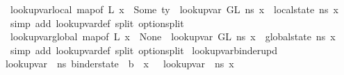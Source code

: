 \begin{isabellebody}
\isanewline
{}\isamarkupfalse%
\ lookup{\isacharunderscore}{\kern0pt}var{\isacharunderscore}{\kern0pt}local{\isacharcolon}{\kern0pt}\ {\isachardoublequoteopen}map{\isacharunderscore}{\kern0pt}of\ L\ x\ {\isacharequal}{\kern0pt}\ Some\ ty\ {\isasymLongrightarrow}\ lookup{\isacharunderscore}{\kern0pt}var\ {\isacharparenleft}{\kern0pt}G{\isacharcomma}{\kern0pt}L{\isacharparenright}{\kern0pt}\ n{\isacharunderscore}{\kern0pt}s\ x\ {\isacharequal}{\kern0pt}\ local{\isacharunderscore}{\kern0pt}state\ n{\isacharunderscore}{\kern0pt}s\ x{\isachardoublequoteclose}\isanewline
%
\isadelimproof
\ \ %
\endisadelimproof
%
\isatagproof
{}\isamarkupfalse%
\ {\isacharparenleft}{\kern0pt}simp\ add{\isacharcolon}{\kern0pt}\ lookup{\isacharunderscore}{\kern0pt}var{\isacharunderscore}{\kern0pt}def\ split{\isacharcolon}{\kern0pt}\ option{\isachardot}{\kern0pt}split{\isacharparenright}{\kern0pt}%
\endisatagproof
{\isafoldproof}%
%
\isadelimproof
\isanewline
%
\endisadelimproof
\isanewline
{}\isamarkupfalse%
\ lookup{\isacharunderscore}{\kern0pt}var{\isacharunderscore}{\kern0pt}global{\isacharcolon}{\kern0pt}\ {\isachardoublequoteopen}map{\isacharunderscore}{\kern0pt}of\ L\ x\ {\isacharequal}{\kern0pt}\ None\ {\isasymLongrightarrow}\ lookup{\isacharunderscore}{\kern0pt}var\ {\isacharparenleft}{\kern0pt}G{\isacharcomma}{\kern0pt}L{\isacharparenright}{\kern0pt}\ n{\isacharunderscore}{\kern0pt}s\ x\ {\isacharequal}{\kern0pt}\ global{\isacharunderscore}{\kern0pt}state\ n{\isacharunderscore}{\kern0pt}s\ x{\isachardoublequoteclose}\isanewline
%
\isadelimproof
\ \ %
\endisadelimproof
%
\isatagproof
{}\isamarkupfalse%
\ {\isacharparenleft}{\kern0pt}simp\ add{\isacharcolon}{\kern0pt}\ lookup{\isacharunderscore}{\kern0pt}var{\isacharunderscore}{\kern0pt}def\ split{\isacharcolon}{\kern0pt}\ option{\isachardot}{\kern0pt}split{\isacharparenright}{\kern0pt}%
\endisatagproof
{\isafoldproof}%
%
\isadelimproof
\isanewline
%
\endisadelimproof
\isanewline
{}\isamarkupfalse%
\ lookup{\isacharunderscore}{\kern0pt}var{\isacharunderscore}{\kern0pt}binder{\isacharunderscore}{\kern0pt}upd{\isacharcolon}{\kern0pt}\isanewline
{\isachardoublequoteopen}lookup{\isacharunderscore}{\kern0pt}var\ {\isasymLambda}\ {\isacharparenleft}{\kern0pt}n{\isacharunderscore}{\kern0pt}s{\isasymlparr}\ binder{\isacharunderscore}{\kern0pt}state\ {\isacharcolon}{\kern0pt}{\isacharequal}{\kern0pt}\ b\ {\isasymrparr}{\isacharparenright}{\kern0pt}\ x\ \ {\isacharequal}{\kern0pt}\ lookup{\isacharunderscore}{\kern0pt}var\ {\isasymLambda}\ n{\isacharunderscore}{\kern0pt}s\ x{\isachardoublequoteclose}%

\end{isabellebody}
